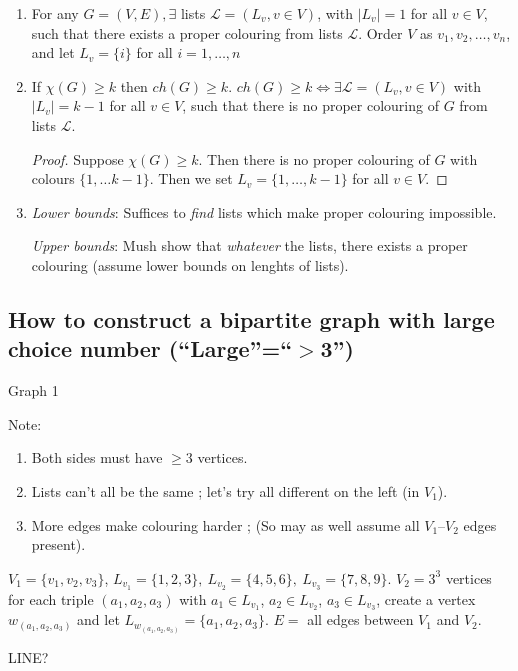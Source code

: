 \documentclass{article}
\begin{document}
\begin{rem}
\begin{enumerate}
 \item For any $G=(V,E), \exists$ lists $\mathcal{L}=(L_v, v\in V)$, with $|L_v|=1$ for all $v \in V$, such that there exists a proper colouring from lists $\mathcal{L}$.  Order $V$ as $v_1, v_2, \ldots, v_n$, and let $L_v = \{i\}$ for all $i=1,\ldots,n$
\item If $\chi(G) \geq k$ then $ch(G)\geq k$.  $ch(G) \geq k \iff \exists \mathcal{L}=(L_v, v\in V)$ with $|L_v|=k-1$ for all $v \in V$, such that there is no proper colouring of $G$ from lists $\mathcal{L}$.
\begin{proof}
Suppose $\chi(G) \geq k$. Then there is no proper colouring of $G$ with colours $\{1, \ldots k-1\}$.  Then we set $L_v = \{1, \ldots, k-1\}$ for all $v \in V$.
\end{proof}
\item \emph{Lower bounds}: Suffices to \emph{find} lists which make proper colouring impossible. 

\emph{Upper bounds}: Mush show that \emph{whatever} the lists, there exists a proper colouring (assume lower bounds on lenghts of lists).
\end{enumerate}
\end{rem}


\subsection*{How to construct a bipartite graph with large choice number (``Large''=``$>$3'')}

Graph 1

Note: \begin{enumerate}
       \item Both sides must have $\geq 3$ vertices.
\item Lists can't all be the same ; let's try all different on the left (in $V_1$).
\item More edges make colouring harder ; (So may as well assume all $V_1$--$V_2$ edges present).
      \end{enumerate}
$V_1 = \{v_1,v_2,v_3\}$, $L_{v_1}=\{1,2,3\},~L_{v_2} = \{4,5,6\}, ~ L_{v_3} = \{7,8,9\}$.
$V_2 = 3^3$ vertices for each triple $(a_1,a_2, a_3)$ with $a_1 \in L_{v_1}$, $a_2 \in L_{v_2}$, $a_3 \in L_{v_3}$, create a vertex $w_{(a_1,a_2,a_3)}$ and let $L_{w_{(a_1,a_2,a_3)}} = \{a_1, a_2, a_3\}$.  $E =$ all edges between $V_1$ and $V_2$.

LINE?
\end{document}
